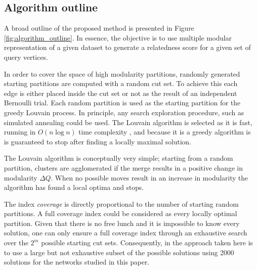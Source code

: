 \documentclass[sigconf]{acmart}
\begin{document}
\subsection{Algorithm outline}
A broad outline of the proposed method is presented in Figure \ref{fig:algorithm_outline}.
In essence, the objective is to use multiple modular representation of a given dataset to generate a relatedness score for a given set of query vertices.

In order to cover the space of high modularity partitions, randomly generated starting partitions are computed with a random cut set.
To achieve this each edge is either placed inside the cut set or not as the result of an independent Bernoulli trial. 
Each random partition is used as the starting partition for the greedy Louvain process.
In principle, any search exploration procedure, such as simulated annealing \cite{GuimeraNature2005} could be used.
The Louvain algorithm is selected as it is fast, running in $O(n \log n)$ time complexity \cite{blondel2008fast}, and because it is a greedy algorithm is is guaranteed to stop after finding a locally maximal solution.

The Louvain algorithm is conceptually very simple; starting from a random partition, clusters are agglomerated if the merge results in a positive change in modularity $\Delta Q$.
When no possible moves result in an increase in modularity the algorithm has found a local optima and stops.

The index \textit{coverage} is directly proportional to the number of starting random partitions.
A full coverage index could be considered as every locally optimal partition.
Given that there is no free lunch and it is impossible to know every solution, one can only ensure a full coverage index through an exhaustive search over the $2^m$ possible starting cut sets.
Consequently, in the approach taken here is to use a large but not exhaustive subset of the possible solutions using 2000 solutions for the networks studied in this paper.
\end{document}
